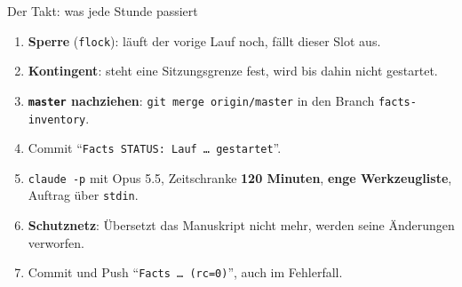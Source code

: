 \documentclass[11pt,aspectratio=169]{beamer}
\newcommand{\datei}[1]{\texttt{#1}}
\begin{document}
\begin{frame}{Der Takt: was jede Stunde passiert}
  \footnotesize
  \hfill
  \begin{minipage}[c]{0.6\textwidth}
    \begin{enumerate}
    \setlength\itemsep{2pt}
    \item \textbf{Sperre} (\texttt{flock}): läuft der vorige Lauf noch, fällt dieser Slot aus.
    \item \textbf{Kontingent}: steht eine Sitzungsgrenze fest, wird bis dahin nicht gestartet.
    \item \textbf{\texttt{master} nachziehen}: \texttt{git merge origin/master} in den Branch
      \texttt{facts-inventory}.
    \item Commit \enquote{\texttt{Facts STATUS: Lauf \dots\ gestartet}}.
    \item \texttt{claude -p} mit Opus 5.5, Zeitschranke \textbf{120 Minuten},
      \textbf{enge Werkzeugliste}, Auftrag über \texttt{stdin}.
    \item \textbf{Schutznetz}: Übersetzt das Manuskript nicht mehr, werden seine
      Änderungen verworfen.
    \item Commit und Push \enquote{\texttt{Facts \dots\ (rc=0)}}, auch im Fehlerfall.
    \end{enumerate}
  \end{minipage}
\end{frame}
\end{document}
